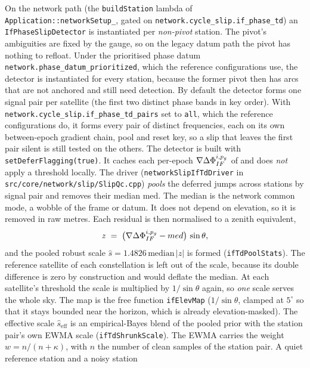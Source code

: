 \documentclass[main.tex]{subfiles}
\begin{document}
On the network path (the \texttt{buildStation} lambda of
\texttt{Application::networkSetup\_}, gated on
\texttt{network.cycle\_slip.if\_phase\_td}) an
\texttt{IfPhaseSlipDetector} is instantiated per \emph{non-pivot}
station.  The pivot's ambiguities are fixed by the gauge, so on the legacy
datum path the pivot has nothing to refloat.  Under the prioritised
phase datum \texttt{network.phase\_datum\_prioritized}, which the reference
configurations use, the detector is instantiated for every station, because
the former pivot then has arcs that are not anchored and still need
detection.  By default the detector forms one signal pair per satellite
(the first two distinct phase bands in key order).  With
\texttt{network.cycle\_slip.if\_phase\_td\_pairs} set to \texttt{all}, which
the reference configurations do, it forms every pair of distinct frequencies,
each on its own between-epoch gradient chain, pool and reset key, so a slip
that leaves the first pair silent is still tested on the others.  The
detector is built with \texttt{setDeferFlagging(true)}.  It caches each
per-epoch $\nabla\Delta \Phi^{i,p_{g}}_{IF}$ of  and
does \emph{not} apply a threshold locally.  The driver
(\texttt{networkSlipIfTdDriver} in
\texttt{src/core/network/slip/SlipQc.cpp}) \emph{pools} the deferred jumps
across stations by signal pair and removes their median $\mathrm{med}$.
The median is the network common mode, a wobble of the frame or datum.
It does not depend on elevation, so it is removed in raw metres.  Each
residual is then normalised to a zenith equivalent,
\begin{equation}
z \;=\; \bigl(\nabla\Delta \Phi^{i,p_{g}}_{IF} - med\bigr)\,\sin\theta,
\end{equation}
and the pooled robust scale $\hat s = 1.4826\,\mathrm{median}\,|z|$ is
formed (\texttt{ifTdPoolStats}).  The reference satellite of each
constellation is left out of the scale, because its double difference is
zero by construction and would deflate the median.  At each satellite's
threshold the scale is multiplied by $1/\sin\theta$ again, so \emph{one}
scale serves the whole sky.  The map is the free function \texttt{ifElevMap}
($1/\sin\theta$, clamped at $5^\circ$ so that it stays bounded near the
horizon, which is already elevation-masked).  The effective scale
$\hat s_{\mathrm{eff}}$ is an empirical-Bayes blend of the pooled prior
with the station pair's own EWMA scale (\texttt{ifTdShrunkScale}).  The
EWMA carries the weight $w = n/(n + \kappa)$, with $n$ the number of clean
samples of the station pair.  A quiet reference station and a noisy station
\end{document}
